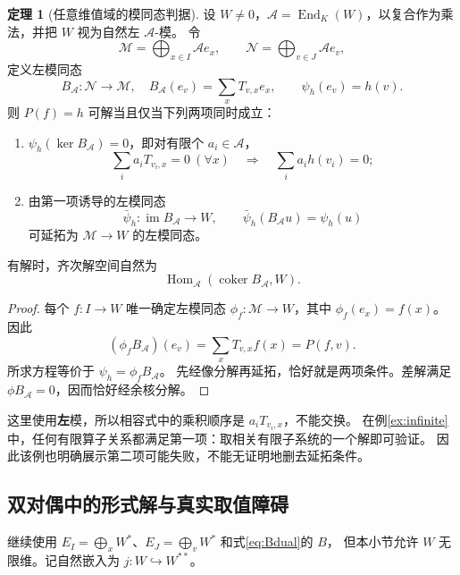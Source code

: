 \documentclass[UTF8,11pt,a4paper]{ctexart}
\theoremstyle{definition}
\newtheorem{theorem}{定理}[section]
\newcommand{\Hom}{\operatorname{Hom}}
\newcommand{\End}{\operatorname{End}}
\newcommand{\im}{\operatorname{im}}
\newcommand{\coker}{\operatorname{coker}}
\newcommand{\calA}{\mathcal A}
\newcommand{\calM}{\mathcal M}
\newcommand{\calN}{\mathcal N}
\numberwithin{equation}{section}
\begin{document}
\begin{theorem}[任意维值域的模同态判据]\label{thm:module}
设 $W\ne0$，$\calA=\End_K(W)$，以复合作为乘法，并把 $W$ 视为自然左 $\calA$-模。
令
\[
 \calM=\bigoplus_{x\in I}\calA e_x,\qquad
 \calN=\bigoplus_{v\in J}\calA e_v,
\]
定义左模同态
\[
 B_{\calA}:\calN\to\calM,\quad B_{\calA}(e_v)=\sum_x T_{v,x}e_x,
 \qquad\psi_h(e_v)=h(v).
\]
则 $P(f)=h$ 可解当且仅当下列两项同时成立：
\begin{enumerate}
\item $\psi_h(\ker B_{\calA})=0$，即对有限个 $a_i\in\calA$，
\[
 \sum_i a_iT_{v_i,x}=0\ (\forall x)\quad\Longrightarrow\quad
 \sum_i a_i h(v_i)=0;
\]
\item 由第一项诱导的左模同态
\[
 \bar\psi_h:\im B_{\calA}\to W,\qquad
 \bar\psi_h(B_{\calA}u)=\psi_h(u)
\]
可延拓为 $\calM\to W$ 的左模同态。
\end{enumerate}
有解时，齐次解空间自然为
\[
 \Hom_{\calA}(\coker B_{\calA},W).
\]
\end{theorem}
\begin{proof}
每个 $f:I\to W$ 唯一确定左模同态
$\phi_f:\calM\to W$，其中 $\phi_f(e_x)=f(x)$。
因此
\[
 (\phi_f B_{\calA})(e_v)=\sum_xT_{v,x}f(x)=P(f,v).
\]
所求方程等价于 $\psi_h=\phi_fB_{\calA}$。
先经像分解再延拓，恰好就是两项条件。差解满足 $\phi B_{\calA}=0$，因而恰好经余核分解。
\end{proof}
这里使用\textbf{左}模，所以相容式中的乘积顺序是 $a_iT_{v_i,x}$，不能交换。
在例\ref{ex:infinite}中，任何有限算子关系都满足第一项：取相关有限子系统的一个解即可验证。
因此该例也明确展示第二项可能失败，不能无证明地删去延拓条件。

\subsection{双对偶中的形式解与真实取值障碍}
继续使用 $E_I=\bigoplus_xW^*$、$E_J=\bigoplus_vW^*$ 和式\eqref{eq:Bdual}的 $B$，
但本小节允许 $W$ 无限维。记自然嵌入为 $j:W\hookrightarrow W^{**}$。
\end{document}
